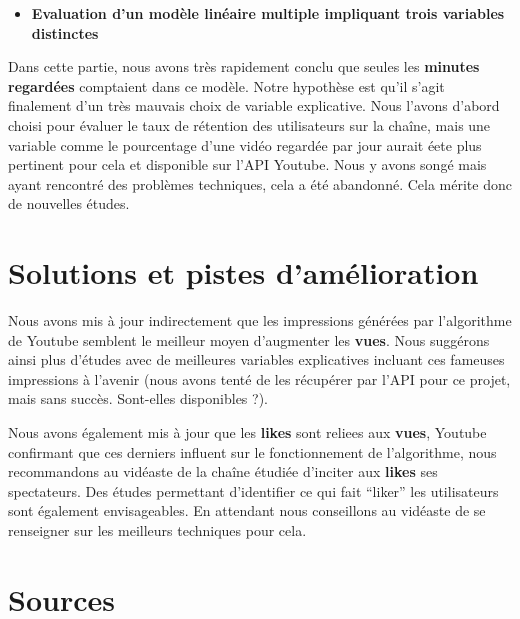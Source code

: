 \begin{itemize}
\tightlist
\item
  \textbf{Evaluation d'un modèle linéaire multiple impliquant trois
  variables distinctes}
\end{itemize}

Dans cette partie, nous avons très rapidement conclu que seules les
\textbf{minutes regardées} comptaient dans ce modèle. Notre hypothèse
est qu'il s'agit finalement d'un très mauvais choix de variable
explicative. Nous l'avons d'abord choisi pour évaluer le taux de
rétention des utilisateurs sur la chaîne, mais une variable comme le
pourcentage d'une vidéo regardée par jour aurait éete plus pertinent
pour cela et disponible sur l'API Youtube. Nous y avons songé mais ayant
rencontré des problèmes techniques, cela a été abandonné. Cela mérite
donc de nouvelles études.

\hypertarget{solutions-et-pistes-damuxe9lioration}{%
\section{Solutions et pistes
d'amélioration}\label{solutions-et-pistes-damuxe9lioration}}

Nous avons mis à jour indirectement que les impressions générées par
l'algorithme de Youtube semblent le meilleur moyen d'augmenter les
\textbf{vues}. Nous suggérons ainsi plus d'études avec de meilleures
variables explicatives incluant ces fameuses impressions à l'avenir
(nous avons tenté de les récupérer par l'API pour ce projet, mais sans
succès. Sont-elles disponibles ?).

Nous avons également mis à jour que les \textbf{likes} sont reliees aux
\textbf{vues}, Youtube confirmant que ces derniers influent sur le
fonctionnement de l'algorithme, nous recommandons au vidéaste de la
chaîne étudiée d'inciter aux \textbf{likes} ses spectateurs. Des études
permettant d'identifier ce qui fait ``liker'' les utilisateurs sont
également envisageables. En attendant nous conseillons au vidéaste de se
renseigner sur les meilleurs techniques pour cela.

\newpage

\hypertarget{sources}{%
\section{Sources}\label{sources}}

